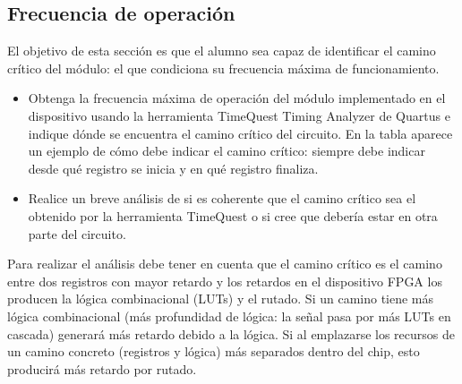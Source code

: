 \documentclass[parskip,a4paper,12pt]{article}
\newcommand{\fila}{}
\begin{document}
\subsection{Frecuencia de operación}
\begin{enunciado}{}{}

El objetivo de esta sección es que el alumno sea capaz de identificar  el camino crítico del módulo: el que condiciona su frecuencia máxima de funcionamiento.  
\begin{itemize}
    \item Obtenga la frecuencia máxima de operación del módulo implementado en el dispositivo usando la herramienta TimeQuest Timing Analyzer de Quartus e indique dónde se encuentra el camino crítico del circuito. En la tabla aparece un ejemplo de cómo debe indicar el camino crítico: siempre debe indicar desde qué registro se inicia y en qué registro finaliza.
    \item Realice un breve análisis de si es coherente que el camino crítico sea el obtenido por la herramienta TimeQuest o si cree que debería estar en otra parte del circuito.
\end{itemize}

Para realizar el análisis debe tener en cuenta que el camino crítico es el camino entre dos registros con mayor retardo y los retardos en el dispositivo FPGA los producen la lógica combinacional (LUTs) y el rutado. Si un camino tiene más lógica combinacional (más profundidad de lógica: la señal pasa por más LUTs en cascada) generará más retardo debido a la lógica. Si al emplazarse los recursos de un camino concreto (registros y lógica) más separados dentro del chip, esto producirá más retardo por rutado.  

\end{enunciado}


\def\colUNO{3cm}
\def\colDOS{12cm}

\begin{table}[H]
    \caption{Frecuencia de reloj y camino crítico del \emph{comp\_cic}}
    \label{tab:frec_clk}
\gdef\cabecera{\fila{$f_{clk} $ (MHz)}{CAMINO CRÍTICO}}
\noindent\begin{mitabla}
\fila{}{} 
\end{mitabla}
\end{table}
\end{document}
